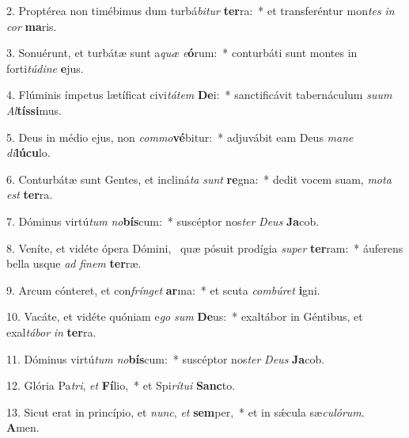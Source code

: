 2. Proptérea non timébimus dum turbá\textit{bi}\textit{tur} \textbf{ter}ra:~*  et transferéntur mon\textit{tes} \textit{in} \textit{cor} \textbf{ma}ris.\

3. Sonuérunt, et turbátæ sunt a\textit{quæ} \textit{e}\textbf{ó}rum:~*  conturbáti sunt montes in forti\textit{tú}\textit{di}\textit{ne} \textbf{e}jus.\

4. Flúminis ímpetus lætíficat civi\textit{tá}\textit{tem} \textbf{De}i:~*  sanctificávit tabernáculum \textit{su}\textit{um} \textit{Al}\textbf{tís}\textbf{si}mus.\

5. Deus in médio ejus, non \textit{com}\textit{mo}\textbf{vé}bitur:~*  adjuvábit eam Deus \textit{ma}\textit{ne} \textit{di}\textbf{lú}\textbf{cu}lo.\

6. Conturbátæ sunt Gentes, et incliná\textit{ta} \textit{sunt} \textbf{re}gna:~*  dedit vocem suam, \textit{mo}\textit{ta} \textit{est} \textbf{ter}ra.\

7. Dóminus virtú\textit{tum} \textit{no}\textbf{bís}cum:~*  suscéptor nos\textit{ter} \textit{De}\textit{us} \textbf{Ja}cob.\

8. Veníte, et vidéte ópera Dómini, \dag\  quæ pósuit prodígia \textit{su}\textit{per} \textbf{ter}ram:~*  áuferens bella usque \textit{ad} \textit{fi}\textit{nem} \textbf{ter}ræ.\

9. Arcum cónteret, et con\textit{frín}\textit{get} \textbf{ar}ma:~*  et scuta \textit{com}\textit{bú}\textit{ret} \textbf{i}gni.\

10. Vacáte, et vidéte quóniam e\textit{go} \textit{sum} \textbf{De}us:~*  exaltábor in Géntibus, et exal\textit{tá}\textit{bor} \textit{in} \textbf{ter}ra.\

11. Dóminus virtú\textit{tum} \textit{no}\textbf{bís}cum:~*  suscéptor nos\textit{ter} \textit{De}\textit{us} \textbf{Ja}cob.\

12. Glória Pa\textit{tri}, \textit{et} \textbf{Fí}lio,~*  et Spi\textit{rí}\textit{tu}\textit{i} \textbf{Sanc}to.\

13. Sicut erat in princípio, et \textit{nunc}, \textit{et} \textbf{sem}per,~*  et in sǽcula sæ\textit{cu}\textit{ló}\textit{rum}. \textbf{A}men.\

